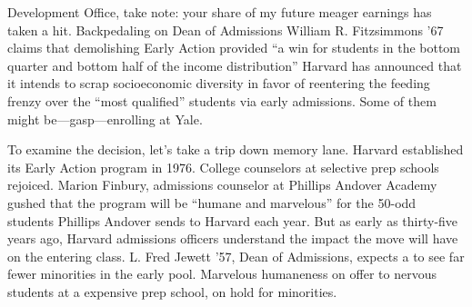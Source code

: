


Development Office, take note: your share of my future meager earnings has
taken a hit. Backpedaling on Dean of Admissions William R. Fitzsimmons ’67
claims that demolishing Early Action provided ``a win for students in the
bottom quarter and bottom half of the income distribution'' Harvard has
announced that it intends to scrap socioeconomic diversity in favor of
reentering the feeding frenzy over the ``most qualified'' students via early
admissions. Some of them might be---gasp---enrolling at Yale.

To examine the decision, let's take a trip down memory lane. Harvard
established its Early Action program in 1976. College counselors at selective
prep schools rejoiced. Marion Finbury, admissions counselor at Phillips
Andover Academy gushed that the program will be ``humane and marvelous'' for
the 50-odd students Phillips Andover sends to Harvard each year. But as early
as thirty-five years ago, Harvard admissions officers understand the impact
the move will have on the entering class. L. Fred Jewett '57, Dean of
Admissions, expects a to see far fewer minorities in the early pool.
Marvelous humaneness on offer to nervous students at a expensive prep school,
on hold for minorities.

